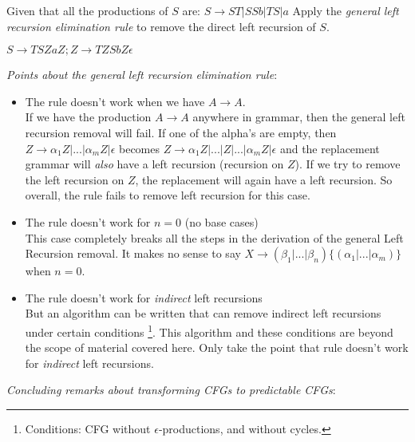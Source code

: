 \frmrule 

\begin{example}
Given that all the productions of $S$ are: $S \rightarrow ST | SSb | TS | a$ 
Apply the \textit{general left recursion elimination rule} to remove the direct 
left recursion of $S$.

{$S \rightarrow TSZ  aZ; Z \rightarrow TZ  SbZ  \epsilon$}

\end{example} 

\frmrule 

\textit{Points about the general left recursion elimination rule}:

\begin{itemize}
\item The rule doesn't work when we have $A \rightarrow A$.  \\
If we have the production $A \rightarrow A$ anywhere in grammar, then 
the general left recursion removal will fail. If one of the alpha's are empty, then 
$Z \rightarrow \alpha_1Z | ... | \alpha_mZ | \epsilon$ becomes 
$Z \rightarrow \alpha_1Z | ... | Z | ... | \alpha_mZ | \epsilon$ and the replacement grammar will \textit{also}
have a left recursion (recursion on $Z$). If we try to remove the left recursion on $Z$, 
the replacement will again have a left recursion. 
So overall, the rule fails to remove left recursion for this case. 
\item The rule doesn't work for $n = 0$ (no base cases) \\
This case completely breaks all the steps in the derivation of the general Left Recursion removal.
It makes no sense to say $X \rightarrow (\beta_1 | ... | \beta_n) \{(\alpha_1 | ... | \alpha_m)\}$ 
when $n = 0$. 
\item The rule doesn't work for \textit{indirect} left recursions\\
But an algorithm can be written that can remove indirect left recursions under certain 
conditions \footnote{Conditions: CFG without $\epsilon$-productions, and without cycles.}. 
This algorithm and these conditions are beyond the scope of material 
covered here. Only take the point that rule doesn't work for \textit{indirect} left recursions.
\end{itemize}

\frmrule 

\textit{Concluding remarks about transforming CFGs to predictable CFGs}:



